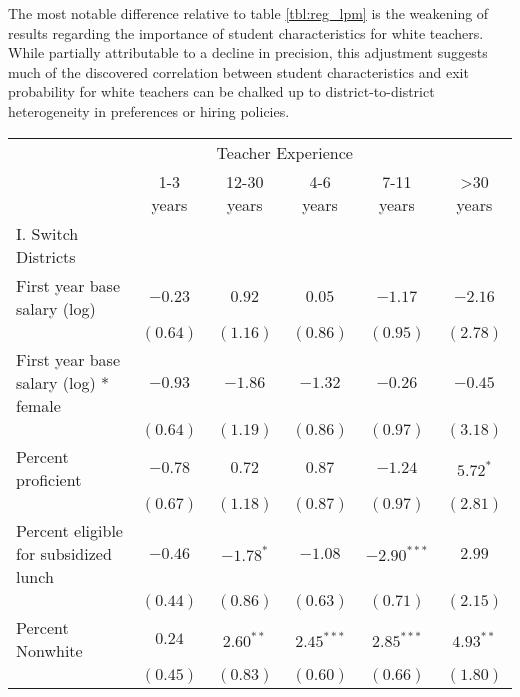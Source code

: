 \documentclass[]{article}
\begin{document}
The most notable difference relative to table \ref{tbl:reg_lpm} is the
weakening of results regarding the importance of student characteristics
for white teachers. While partially attributable to a decline in
precision, this adjustment suggests much of the discovered correlation
between student characteristics and exit probability for white teachers
can be chalked up to district-to-district heterogeneity in preferences
or hiring policies.

\begin{table}
\begin{center}
\begin{tabular}{l c c c c c }
\hline
 & \multicolumn{4}{c}{Teacher Experience} \\ \cline{2-6}
 & 1-3 years & 12-30 years & 4-6 years & 7-11 years & >30 years \\
\hline
I. Switch Districts                             &               &              &               &               &              \\
\quad First year base salary (log)           & $-0.23$       & $0.92$       & $0.05$        & $-1.17$       & $-2.16$      \\
                                                & $(0.64)$      & $(1.16)$     & $(0.86)$      & $(0.95)$      & $(2.78)$     \\
\quad First year base salary (log) * female  & $-0.93$       & $-1.86$      & $-1.32$       & $-0.26$       & $-0.45$      \\
                                                & $(0.64)$      & $(1.19)$     & $(0.86)$      & $(0.97)$      & $(3.18)$     \\
\quad Percent proficient                     & $-0.78$       & $0.72$       & $0.87$        & $-1.24$       & $5.72^{*}$   \\
                                                & $(0.67)$      & $(1.18)$     & $(0.87)$      & $(0.97)$      & $(2.81)$     \\
\quad Percent eligible for subsidized lunch  & $-0.46$       & $-1.78^{*}$  & $-1.08$       & $-2.90^{***}$ & $2.99$       \\
                                                & $(0.44)$      & $(0.86)$     & $(0.63)$      & $(0.71)$      & $(2.15)$     \\
\quad Percent Nonwhite                       & $0.24$        & $2.60^{**}$  & $2.45^{***}$  & $2.85^{***}$  & $4.93^{**}$  \\
                                                & $(0.45)$      & $(0.83)$     & $(0.60)$      & $(0.66)$      & $(1.80)$     \\

\end{tabular}
\end{center}
\end{table}
\end{document}
